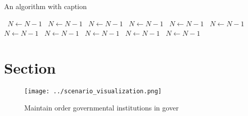 \documentclass[a4paper]{article}
\begin{document}
\begin{algorithm}
\caption{An algorithm with caption}
\begin{algorithmic}
\    \State $N \gets N - 1$
\    \State $N \gets N - 1$
\    \State $N \gets N - 1$
\    \State $N \gets N - 1$
\    \State $N \gets N - 1$
\    \State $N \gets N - 1$
\    \State $N \gets N - 1$
\    \State $N \gets N - 1$
\    \State $N \gets N - 1$
\    \State $N \gets N - 1$
\    \State $N \gets N - 1$
\EndWhile
\end{algorithmic}
\end{algorithm}

\section{Section}

\begin{figure}
\centering
\texttt{[image: ../scenario\_visualization.png]}
\caption{Maintain order governmental institutions in gover
}
\end{figure}
 
\end{document}
